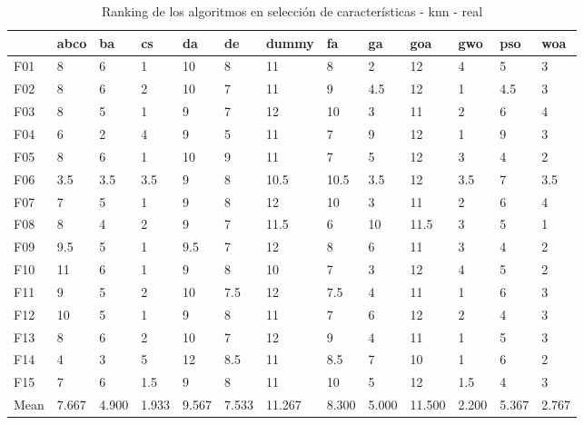 \begin{table}
    \centering
    \begin{adjustbox}{width=\linewidth}
        \begin{tabular}{lllllllllllll}
            \toprule
            {}   & abco  & ba    & cs    & da    & de    & dummy  & fa    & ga    & goa    & gwo   & pso   & woa   \\
            \midrule
            F01  & 8     & 6     & 1     & 10    & 8     & 11     & 8     & 2     & 12     & 4     & 5     & 3     \\
            F02  & 8     & 6     & 2     & 10    & 7     & 11     & 9     & 4.5   & 12     & 1     & 4.5   & 3     \\
            F03  & 8     & 5     & 1     & 9     & 7     & 12     & 10    & 3     & 11     & 2     & 6     & 4     \\
            F04  & 6     & 2     & 4     & 9     & 5     & 11     & 7     & 9     & 12     & 1     & 9     & 3     \\
            F05  & 8     & 6     & 1     & 10    & 9     & 11     & 7     & 5     & 12     & 3     & 4     & 2     \\
            F06  & 3.5   & 3.5   & 3.5   & 9     & 8     & 10.5   & 10.5  & 3.5   & 12     & 3.5   & 7     & 3.5   \\
            F07  & 7     & 5     & 1     & 9     & 8     & 12     & 10    & 3     & 11     & 2     & 6     & 4     \\
            F08  & 8     & 4     & 2     & 9     & 7     & 11.5   & 6     & 10    & 11.5   & 3     & 5     & 1     \\
            F09  & 9.5   & 5     & 1     & 9.5   & 7     & 12     & 8     & 6     & 11     & 3     & 4     & 2     \\
            F10  & 11    & 6     & 1     & 9     & 8     & 10     & 7     & 3     & 12     & 4     & 5     & 2     \\
            F11  & 9     & 5     & 2     & 10    & 7.5   & 12     & 7.5   & 4     & 11     & 1     & 6     & 3     \\
            F12  & 10    & 5     & 1     & 9     & 8     & 11     & 7     & 6     & 12     & 2     & 4     & 3     \\
            F13  & 8     & 6     & 2     & 10    & 7     & 12     & 9     & 4     & 11     & 1     & 5     & 3     \\
            F14  & 4     & 3     & 5     & 12    & 8.5   & 11     & 8.5   & 7     & 10     & 1     & 6     & 2     \\
            F15  & 7     & 6     & 1.5   & 9     & 8     & 11     & 10    & 5     & 12     & 1.5   & 4     & 3     \\
            Mean & 7.667 & 4.900 & 1.933 & 9.567 & 7.533 & 11.267 & 8.300 & 5.000 & 11.500 & 2.200 & 5.367 & 2.767 \\
            \bottomrule
        \end{tabular}
    \end{adjustbox}
    \caption{Ranking de los algoritmos en selección de características - knn - real}
    \label{tab:ranking_sel_rate_real_knn}
\end{table}

